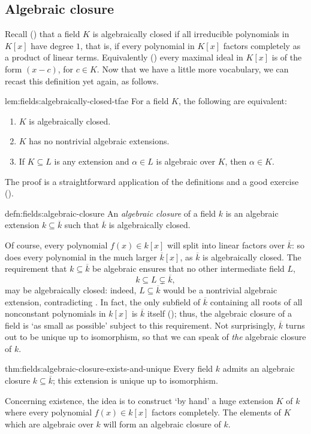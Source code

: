 \subsection{Algebraic closure}%
\label{subsec:fields:algebraic-closure}
Recall () that a field $K$ is algebraically
closed if all irreducible polynomials in $K[x]$ have degree $1$, that
is, if every polynomial in $K[x]$ factors completely as a product of
linear terms.  Equivalently
() every maximal ideal in
$K[x]$ is of the form $(x - c)$, for $c \in K$. Now that we have a
little more vocabulary, we can recast this definition yet again, as
follows.
\begin{lem}{}{lem:fields:algebraically-closed-tfae}
  For a field $K$, the following are equivalent:
  \begin{enumerate}[label=(\roman*)]
  \item $K$ is algebraically closed.
  \item $K$ has no nontrivial algebraic extensions.
  \item If $K \subseteq L$ is any extension and $\alpha \in L$ is
    algebraic over $K$, then $\alpha \in K$.
  \end{enumerate}
\end{lem}
The proof is a straightforward application of the definitions and a
good exercise ().
\begin{defn}{}{defn:fields:algebraic-closure}
  An \emph{algebraic closure} of a field $k$ is an algebraic extension
  $k \subseteq \overline{k}$ such that $\overline{k}$ is algebraically
  closed.
\end{defn}
Of course, every polynomial $f(x) \in k[x]$ will split into linear
factors over $\overline{k}$: so does every polynomial in the much
larger $\overline{k}[x]$, as $\overline{k}$ is algebraically
closed. The requirement that $k \subseteq \overline{k}$ be algebraic
ensures that no other intermediate field $L$,
\[
  k \subseteq L \subsetneq \overline{k},
\]
may be algebraically closed: indeed, $L \subseteq \overline{k}$ would
be a nontrivial algebraic extension, contradicting
. In fact, the only subfield of $\overline{k}$
containing all roots of all nonconstant polynomials in $k[x]$ is
$\overline{k}$ itself
();
thus, the algebraic closure of a field is `as small as possible'
subject to this requirement. Not surprisingly, $\overline{k}$ turns
out to be unique up to isomorphism, so that we can speak of \emph{the}
algebraic closure of $k$.
\begin{thm}{}{thm:fields:algebraic-closure-exists-and-unique}
  Every field $k$ admits an algebraic closure
  $k \subseteq \overline{k}$; this extension is unique up to
  isomorphism.
\end{thm}
Concerning existence, the idea is to construct `by hand' a huge
extension $K$ of $k$ where every polynomial $f(x) \in k[x]$ factors
completely. The elements of $K$ which are algebraic over $k$ will form
an algebraic closure of $k$.

